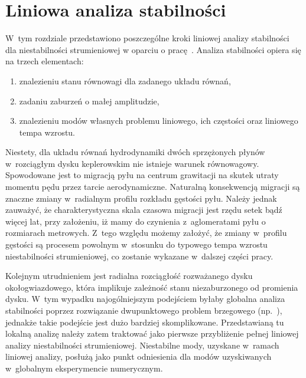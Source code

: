 
\chapter{Liniowa analiza stabilności}
\label{sec:lsa}
W~tym rozdziale przedstawiono poszczególne kroki liniowej analizy stabilności
dla niestabilności strumieniowej w oparciu o pracę~\citep{YG05}.
Analiza stabilności opiera się na trzech elementach:
\begin{enumerate}
   \item znalezieniu stanu równowagi dla zadanego układu równań,
   \item zadaniu zaburzeń o małej amplitudzie,
   \item znalezieniu modów własnych problemu liniowego, ich częstości oraz
      liniowego tempa wzrostu. 
\end{enumerate}
Niestety, dla układu równań hydrodynamiki dwóch sprzężonych płynów w~rozciągłym
dysku keplerowskim nie istnieje warunek równowagowy. Spowodowane jest to
migracją pyłu na centrum grawitacji na skutek utraty momentu pędu przez tarcie
aerodynamiczne. Naturalną konsekwencją migracji są znaczne zmiany w~radialnym
profilu rozkładu gęstości pyłu. Należy jednak zauważyć, że charakterystyczna
skala czasowa migracji jest rzędu setek bądź więcej lat, przy założeniu, iż mamy
do czynienia z~aglomeratami pyłu o rozmiarach metrowych. Z~tego względu możemy
założyć, że zmiany w~profilu gęstości są procesem powolnym w~stosunku do typowego
tempa wzrostu niestabilności strumieniowej, co zostanie wykazane w~dalszej
części pracy.

Kolejnym utrudnieniem jest radialna rozciągłość rozważanego dysku
okołogwiazdowego, która implikuje zależność stanu niezaburzonego od
promienia dysku. W~tym wypadku najogólniejszym podejściem byłaby
globalna analiza stabilności poprzez rozwiązanie dwupunktowego problem
brzegowego (np.~\cite{PHM04, KH06}), jednakże takie podejście jest dużo bardziej
skomplikowane. Przedstawianą tu lokalną analizę należy zatem traktować jako
pierwsze przybliżenie pełnej liniowej analizy niestabilności strumieniowej.
Niestabilne mody, uzyskane w~ramach liniowej analizy, posłużą jako punkt
odniesienia dla modów uzyskiwanych w~globalnym eksperymencie numerycznym.

